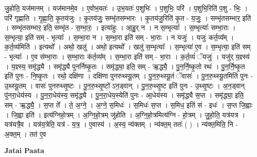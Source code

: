 \documentclass[17pt]{extarticle}
\begin{document}
जु॒होति॒ यज॑मानम् । यज॑मानमे॒व । ए॒वोभ॒यतः॑ । उ॒भ॒यतः॑ प॒शुभिः॑ । प॒शुभिः॒ परि॑ । प॒शुभि॒रिति॑ प॒शु - भिः॒ । परि॑ गृह्णाति । गृ॒ह्णा॒ति॒ कृ॒तय॑जुः । कृ॒तय॑जुः॒ सम्भृ॑तसम्भारः । कृ॒तय॑जु॒रिति॑ कृ॒त - य॒जुः॒ । सम्भृ॑तसम्भार॒ इति॑ । सम्भृ॑तसम्भार॒ इति॒ सम्भृ॑त - स॒म्भा॒रः॒ । इत्या॑हुः । आ॒हु॒र् न । न स॒म्भृत्याः᳚ । स॒म्भृत्याः᳚ सम्भा॒राः । स॒म्भृत्या॒ इति॑ सम् - भृत्याः᳚ । स॒म्भा॒रा न । स॒म्भा॒रा इति॑ सम् - भा॒राः । न यजुः॑ । यजुः॑ कर्त॒व्य᳚म् । क॒र्त॒व्य॑मिति॑ । इत्यथो᳚ । अथो॒ खलु॑ । अथो॒ इत्यथो᳚ । खलु॑ स॒म्भृत्याः᳚ । स॒म्भृत्या॑ ए॒व । स॒म्भृत्या॒ इति॑ सम् - भृत्याः᳚ । ए॒व स॑म्भा॒राः । स॒म्भा॒राः क॑र्त॒व्य᳚म् । स॒म्भा॒रा इति॑ सम् - भा॒राः । क॒र्त॒व्यं॑ ॅयजुः॑ । यजु॑र् य॒ज्ञ्स्य॑ । य॒ज्ञ्स्य॒ समृ॑द्ध्यै । समृ॑द्ध्यै पुनर्निष्कृ॒तः । समृ॑द्ध्या॒ इति॒ सम् - ऋ॒द्ध्यै॒ । पु॒न॒र्नि॒ष्कृ॒तो रथः॑ । पु॒न॒र्नि॒ष्कृ॒त इति॑ पुनः - नि॒ष्कृ॒तः । रथो॒ दक्षि॑णा । दक्षि॑णा पुनरुथ्स्यू॒तम् । पु॒न॒रु॒थ्स्यू॒तं ॅवासः॑ । पु॒न॒रु॒थ्स्यू॒तमिति॑ पुनः - उ॒थ्स्यू॒तम् । वासः॑ पुनरुथ्सृ॒ष्टः । पु॒न॒रु॒थ्सृ॒ष्टो॑ ऽन॒ड्वान् । पु॒न॒रु॒थ्सृ॒ष्ट इति॑ पुनः - उ॒थ्सृ॒ष्टः । अ॒न॒ड्वान् पु॑नरा॒धेय॑स्य । पु॒न॒रा॒धेय॑स्य॒ समृ॑द्ध्यै । पु॒न॒रा॒धेय॒स्येति॑ पुनः - आ॒धेय॑स्य । समृ॑द्ध्यै स॒प्त । समृ॑द्ध्या॒ इति॒ सम् - ऋ॒द्ध्यै॒ । स॒प्त ते᳚ । ते॒ अ॒ग्ने॒ । अ॒ग्ने॒ स॒मिधः॑ । स॒मिधः॑ स॒प्त । स॒मिध॒ इति॑ सं - इधः॑ । स॒प्त जि॒ह्वाः । जि॒ह्वा इति॑ । इत्य॑ग्निहो॒त्रम् । अ॒ग्नि॒हो॒त्रम् जु॑होति । अ॒ग्नि॒हो॒त्रमित्य॑ग्नि - हो॒त्रम् । जु॒हो॒ति॒ यत्र॑यत्र । यत्र॑यत्रै॒व । यत्र॑य॒त्रेति॒ यत्र॑ - य॒त्र॒ । ए॒वास्य॑ । अ॒स्य॒ न्य॑क्तम् । न्य॑क्त॒म् ततः॑ ( ) । न्य॑क्त॒मिति॒ नि - अ॒क्त॒म् । तत॑ ए॒व \newline

\textbf{Jatai Paata} \newline
\end{document}
